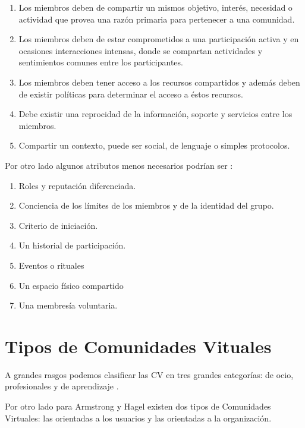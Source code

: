 \begin{enumerate}
\item Los miembros deben de compartir un mismos objetivo, interés, necesidad o actividad que provea una razón primaria para pertenecer a una comunidad.  
\item Los miembros deben de estar comprometidos a una participación activa y en ocasiones interacciones intensas, donde se compartan actividades y sentimientos comunes entre los participantes.
\item Los miembros deben tener acceso a los recursos compartidos y además deben de existir políticas para determinar el acceso a éstos recursos.
\item Debe existir una reprocidad de la información, soporte y servicios entre los miembros.
\item Compartir un contexto, puede ser social, de lenguaje o simples protocolos. 
\end{enumerate}

Por otro lado algunos atributos menos necesarios podrían ser \cite{whittaker:1997}:
\begin{enumerate}
\item Roles y reputación diferenciada.
\item Conciencia de los límites de los miembros y de la identidad del grupo.
\item Criterio de iniciación.
\item Un historial de participación.
\item Eventos o rituales
\item Un espacio físico compartido
\item Una membresía voluntaria. 
\end{enumerate}


\section{Tipos de Comunidades Vituales}

A grandes rasgos podemos clasificar las CV en tres grandes categorías: de ocio, profesionales y de aprendizaje \cite{cabero}. 

Por otro lado para Armstrong y Hagel \cite{armstrong:1997} existen dos tipos de Comunidades Virtuales: las orientadas a los usuarios y las orientadas a la organización. 

